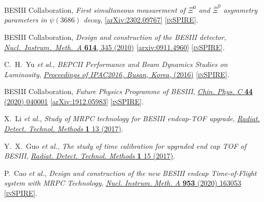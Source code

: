 \documentclass[a4paper,11pt]{article}
\begin{document}
\begin{thebibliography}{**}
BESIII Collaboration, 
\textit{First simultaneous measurement of $\Xi^0$ and $\bar{\Xi}^0$ asymmetry parameters in $\psi(3686)$ decay}, 
\href{https://arxiv.org/pdf/2302.09767.pdf}{
[arXiv:2302.09767]}
[\textcolor{blue}{\href{https://inspirehep.net/literature/2634735}{\textsc{inSPIRE}}}].

 
 
 
 BESIII Collaboration,
\textit{Design and construction of the BESIII detector}, 
 \href{https://www.sciencedirect.com/science/article/pii/S0168900209023870/}{\textit{ Nucl.\ Instrum.\ Meth.\ A} {\bf 614}, 345 (2010)}
  [\textcolor{blue}{\href{https://arxiv.org/ftp/arxiv/papers/0911/0911.4960.pdf}{arxiv:0911.4960}}] 
[\textcolor{blue}{\href{https://inspirehep.net/literature/838149}{\textsc{inSPIRE}}}]. 
  
  
  
  

   C.~H.~Yu {\it et al.},
  \textit{BEPCII Performance and Beam Dynamics Studies on Luminosity},
 \href{https://accelconf.web.cern.ch/ipac2016/papers/tuya01.pdf}{\textit{Proceedings of IPAC2016, Busan, Korea,} (2016)}
[\textcolor{blue}{\href{https://inspirehep.net/literature/1469857}{\textsc{inSPIRE}}}]. 

BESIII Collaboration, 
\textit{Future Physics Programme of BESIII}, 
\textcolor{blue}{\href{https://doi.org/10.1088/1674-1137/44/4/040001} {\textit{Chin. Phys. C} \textbf{44} (2020)  040001} }
[\textcolor{blue}{\href{https://arxiv.org/abs/1912.05983}{arXiv:1912.05983}}] 
[\textcolor{blue}{\href{https://inspirehep.net/search?p=find+EPRINT\%2BarXiv\%3A1912.05983 }{\textsc{inSPIRE}}}].

X.~Li \textit{et al.},
\textit{Study of MRPC technology for BESIII endcap-TOF upgrade}, 
\textcolor{blue}{\href{https://doi.org/10.1007/s41605-017-0014-2} {\textit{Radiat. Detect. Technol. Methods} {\textbf 1} 13 (2017)}}. 

Y.~X.~Guo \textit{et al.},
\textit{The study of time calibration for upgraded end cap TOF of BESIII}, 
\textcolor{blue}{\href{https://doi.org/10.1007/s41605-017-0012-4} {\textit{Radiat. Detect. Technol. Methods} {\textbf 1} 15 (2017)}}. 

 P.~Cao \textit{et al.},
\textit{Design and construction of the new BESIII endcap Time-of-Flight system with MRPC Technology}, 
\textcolor{blue}{\href{https://doi.org/10.1016/j.nima.2019.163053} {\textit{Nucl. Instrum. Meth. A} \textbf{953} (2020) 163053}} 
[\textcolor{blue}{\href{https://inspirehep.net/literature/1775466 }{\textsc{inSPIRE}}}].


\end{thebibliography}
\end{document}

